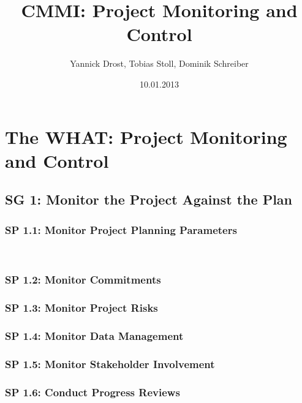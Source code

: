 \documentclass[accentcolor=tud10d]{tudbeamer}
\title{CMMI: Project Monitoring and Control}
\author{Yannick Drost, Tobias Stoll, Dominik Schreiber}
\date{10.01.2013}
\newcommand{\strong}[1]{\textaccentcolor{\textsf{\textbf{#1}}}}
\newenvironment{subframe}{\begin{frame}{\insertsubsectionhead\\\strong{\insertsubsubsectionhead}}}{\end{frame}}
\begin{document}
\begin{titleframe}
\end{titleframe}

\section{The WHAT: Project Monitoring and Control}


\subsection{SG 1: Monitor the Project Against the Plan}

\subsubsection{SP 1.1: Monitor Project Planning Parameters}
\begin{subframe}

\end{subframe}

\subsubsection{SP 1.2: Monitor Commitments}

\subsubsection{SP 1.3: Monitor Project Risks}

\subsubsection{SP 1.4: Monitor Data Management}

\subsubsection{SP 1.5: Monitor Stakeholder Involvement}

\subsubsection{SP 1.6: Conduct Progress Reviews}
\end{document}
